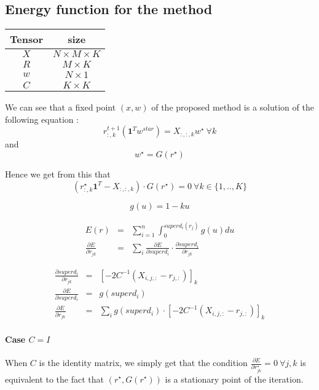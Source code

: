 \subsection*{Energy function for the method}

\begin{tabular}{|c|c|}
\hline 
Tensor & size\\
\hline
$X$ & $N\times M \times K$\\
\hline
$R$ & $M\times K$\\
\hline
$w$ & $N\times 1$\\
\hline
$C$ & $K\times K$\\
\hline
\end{tabular}

We can see that a fixed point $(x,w)$ of the proposed method is a solution of the following equation :
$$ r_{:,k}^{t+1} (\mathbf{1}^Tw^{star}) = X_{:,:,k}w^{\star} \: \forall k$$
and 
$$ w^{\star} = G(r^{\star})$$

Hence we get from this that
$$(r_{:,k}^{\star} \mathbf{1}^T - X_{:,:,k})\cdot G(r^{\star}) = 0 \: \forall k\in \{1,..,K\}$$


$$g(u) = 1 -ku$$

\begin{eqnarray*}
E(r) & = & \sum_{i=1}^n \int_0^{superd_i(r_j)}g(u) du\\
\frac{\partial E}{\partial r_{jk}} & = & \sum_{i}\frac{\partial E}{\partial superd_i} \cdot \frac{\partial superd_i}{\partial r_{jk}}
\end{eqnarray*}

\begin{eqnarray*}
\frac{\partial superd_i}{\partial r_{jk}} & = & \left[-2 C^{-1}(X_{i,j,:}-r_{j,:})\right]_{k} \\
\frac{\partial E}{\partial superd_i} & = & g(superd_i)\\
\frac{\partial E}{\partial r_{jk}} & = & \sum_{i}g(superd_i) \cdot \left[-2 C^{-1}(X_{i,j,:}-r_{j,:})\right]_{k} 
\end{eqnarray*}

\paragraph{Case $C = I$}

When $C$ is the identity matrix, we simply get that the condition $\frac{\partial E}{\partial r^{\star}_{jk}}=0 \: \forall j,k$ is equivalent to the fact that $(r^{\star},G(r^{\star}))$ is a stationary point of the iteration.

